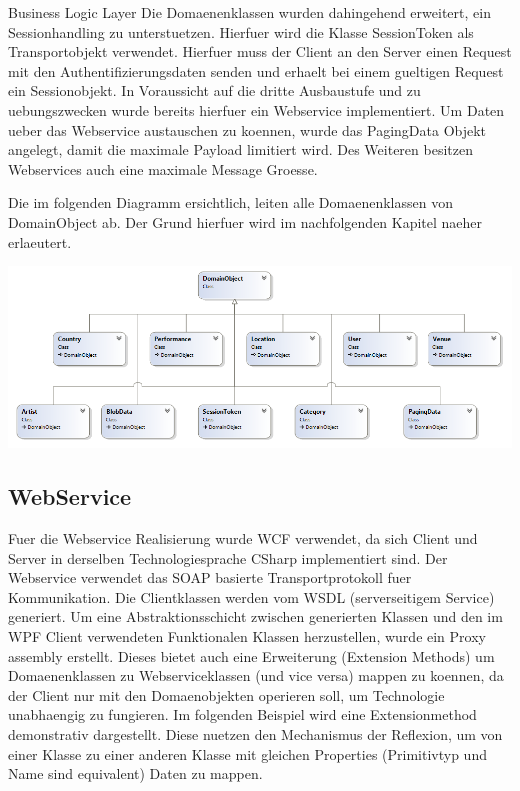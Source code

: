 \begin{section}{Business Logic Layer}
Die Domaenenklassen wurden dahingehend erweitert, ein Sessionhandling zu unterstuetzen. Hierfuer wird die Klasse SessionToken als Transportobjekt verwendet. Hierfuer muss der Client an den Server einen Request mit den Authentifizierungsdaten senden und erhaelt bei einem gueltigen Request ein Sessionobjekt.
In Voraussicht auf die dritte Ausbaustufe und zu uebungszwecken wurde bereits hierfuer ein Webservice implementiert. Um Daten ueber das Webservice austauschen zu koennen, wurde das PagingData Objekt angelegt, damit die maximale Payload limitiert wird. Des Weiteren besitzen Webservices auch eine maximale Message Groesse.

Die im folgenden Diagramm ersichtlich, leiten alle Domaenenklassen von DomainObject ab. Der Grund hierfuer wird im nachfolgenden Kapitel naeher erlaeutert. 

\includegraphics[angle=0, scale=0.45]{./img/domainclasses.PNG}
\FloatBarrier

\subsection{WebService}

Fuer die Webservice Realisierung wurde WCF verwendet, da sich Client und Server in derselben Technologiesprache CSharp implementiert sind. Der Webservice verwendet das SOAP basierte Transportprotokoll fuer Kommunikation. Die Clientklassen werden vom WSDL (serverseitigem Service) generiert. 
Um eine Abstraktionsschicht zwischen generierten Klassen und den im WPF Client verwendeten Funktionalen Klassen herzustellen, wurde ein Proxy assembly erstellt. Dieses bietet auch eine Erweiterung (Extension Methods) um Domaenenklassen zu Webserviceklassen (und vice versa) mappen zu koennen, da der Client nur mit den Domaenobjekten operieren soll, um Technologie unabhaengig zu fungieren. 
Im folgenden Beispiel wird eine Extensionmethod demonstrativ dargestellt. Diese nuetzen den Mechanismus der Reflexion, um von einer Klasse zu einer anderen Klasse mit gleichen Properties (Primitivtyp und Name sind equivalent) Daten zu mappen.


\end{section}
